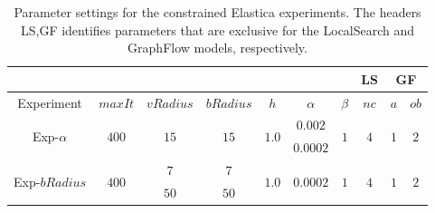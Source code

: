 \begin{table}
\centering
\begin{tabular}{|c|c|c|c|c|c|c|c|c|c|}
\cline{8-10}
\multicolumn{7}{c|}{} & LS & \multicolumn{2}{|c|}{GF}\\
\hline
Experiment & $maxIt$ & $vRadius$ & $bRadius$ & $h$ & $\alpha$ & $\beta$  & $nc$ & $a$ & $ob$ \\
\hline
\multirow{2}{*}{Exp-$\alpha$} & \multirow{2}{*}{$400$} & \multirow{2}{*}{$15$} & \multirow{2}{*}{$15$} & \multirow{2}{*}{$1.0$} & $0.002$ & \multirow{2}{*}{$1$}  & \multirow{2}{*}{$4$} & \multirow{2}{*}{$1$} & \multirow{2}{*}{$2$} \\
& & & & & $0.0002$ & & &\\
\hline
\multirow{2}{*}{Exp-$bRadius$} & \multirow{2}{*}{$400$} & $7$ & $7$ & \multirow{2}{*}{$1.0$} & \multirow{2}{*}{$0.0002$} & \multirow{2}{*}{$1$}  & \multirow{2}{*}{$4$} & \multirow{2}{*}{$1$} & \multirow{2}{*}{$2$} \\
& & $50$ & $50$ & & & & &\\
\hline
\end{tabular}
\caption{Parameter settings for the constrained Elastica experiments. The headers LS,GF identifies parameters that are exclusive for the LocalSearch and GraphFlow models, respectively.}
\label{tab:constrained-elastica-parameters-summary}
\end{table}

